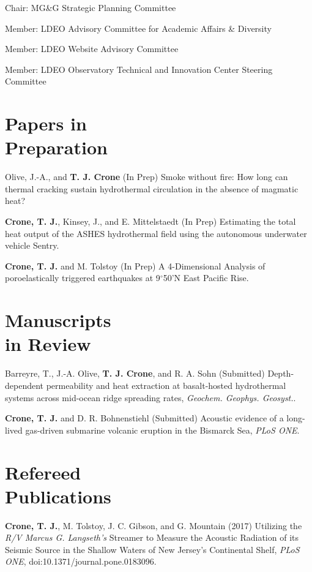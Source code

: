 \documentclass[11pt]{res}
\begin{document}
\begin{resume}
Chair: MG\&G Strategic Planning Committee

Member: LDEO Advisory Committee for Academic Affairs \& Diversity

Member: LDEO Website Advisory Committee

Member: LDEO Observatory Technical and Innovation Center Steering Committee
\vspace{0.2in}

\section{\sc Papers in\\Preparation}

Olive, J.-A., and {\bf T. J. Crone} (In Prep) Smoke without fire: How long can thermal cracking sustain hydrothermal circulation in the absence of magmatic heat?

{\bf Crone, T. J.}, Kinsey, J., and E. Mittelstaedt (In Prep) Estimating the total heat output of the ASHES hydrothermal field using the autonomous underwater vehicle Sentry.

{\bf Crone, T. J.} and M. Tolstoy (In Prep) A 4-Dimensional Analysis of poroelastically triggered earthquakes at 9$^\circ$50'N East Pacific Rise.

\section{\sc Manuscripts\\in Review}

Barreyre, T., J.-A. Olive, {\bf T. J. Crone}, and R. A. Sohn (Submitted) Depth-dependent permeability and heat extraction at basalt-hosted hydrothermal systems across mid-ocean ridge spreading rates, {\em Geochem. Geophys. Geosyst.}.

{\bf Crone, T. J.} and D. R. Bohnenstiehl (Submitted) Acoustic evidence of a long-lived gas-driven submarine volcanic eruption in the Bismarck Sea, {\em PLoS ONE}.

\section{\sc Refereed\\Publications}

{\bf Crone, T. J.}, M. Tolstoy, J. C. Gibson, and G. Mountain (2017)
Utilizing the \textit{R/V Marcus G. Langseth's} Streamer to Measure the Acoustic Radiation of its Seismic Source in the Shallow Waters of New Jersey's Continental Shelf, \textit{PLoS ONE}, doi:10.1371/journal.pone.0183096.


\end{resume}
\end{document}
